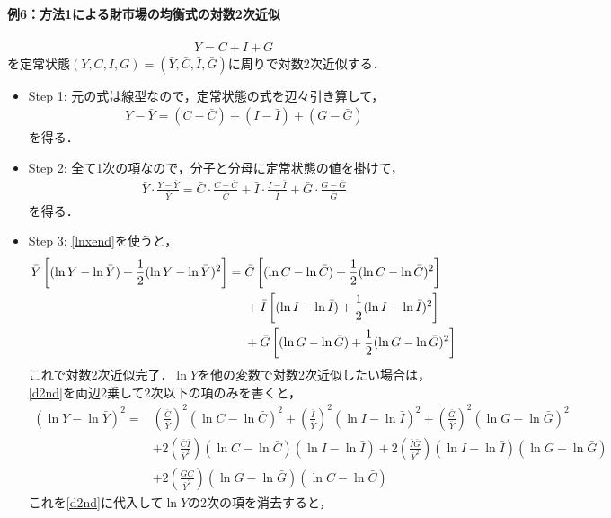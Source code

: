 \documentclass[a4paper,12pt,onecolumn,oneside,notitlepage,final]{article}
\begin{document}
\paragraph{例6：方法1による財市場の均衡式の対数2次近似}
\begin{align*}
Y = C + I + G
\end{align*}
を定常状態$(Y,C,I,G) = (\bar Y, \bar C, \bar I, \bar G)$に周りで対数2次近似する．
\begin{itemize}
\item Step 1: 元の式は線型なので，定常状態の式を辺々引き算して，
\begin{align*}
Y - \bar Y = (C-\bar C)+ (I - \bar I) + (G-\bar G)
\end{align*}
を得る．
\item Step 2: 全て1次の項なので，分子と分母に定常状態の値を掛けて，
\begin{align*}
\bar Y \cdot \frac{Y-\bar Y}{\bar Y} = \bar C \cdot \frac{C-\bar C}{\bar C} + \bar I \cdot \frac{I- \bar I}{\bar I} + \bar G \cdot\frac{G-\bar G}{\bar G}
\end{align*}
を得る．
\item Step 3: \eqref{lnxend}を使うと，
\begin{align}
\bar Y \left[(\ln Y - \ln \bar Y) + \frac{1}{2} (\ln Y - \ln \bar Y)^2\right] = \; &\bar C\left[(\ln C - \ln \bar C) + \frac{1}{2}(\ln C - \ln \bar C)^2\right]\notag\\
&+\bar I \left[(\ln I - \ln \bar I) + \frac{1}{2} (\ln I - \ln \bar I)^2\right]\notag\\
&+\bar G\left[(\ln G - \ln \bar G) + \frac{1}{2} (\ln G - \ln \bar G)^2\right] \label{d2nd}
\end{align}
これで対数2次近似完了．$\ln Y$を他の変数で対数2次近似したい場合は， \eqref{d2nd}を両辺2乗して2次以下の項のみを書くと，
\begin{align*}
(\ln Y - \ln \bar Y)^2 = &\left(\frac{\bar C}{\bar Y}\right)^2 (\ln C - \ln \bar C)^2 + \left(\frac{\bar I}{\bar Y}\right)^2 (\ln I - \ln \bar I)^2 + \left(\frac{\bar G}{\bar Y}\right)^2 (\ln G - \ln \bar G)^2 \\
&+ 2\left(\frac{\bar C \bar I}{\bar Y^2}\right) (\ln C - \ln \bar C) (\ln I - \ln \bar I) + 2\left(\frac{\bar I \bar G}{\bar Y^2}\right) (\ln I - \ln \bar I) (\ln G - \ln \bar G) \\
&+ 2\left(\frac{\bar G \bar C}{\bar Y^2}\right) (\ln G - \ln \bar G) (\ln C - \ln \bar C)
\end{align*}
これを\eqref{d2nd}に代入して$\ln Y$の2次の項を消去すると，
\begin{align*}

\end{align*}
\end{itemize}
\end{document}
